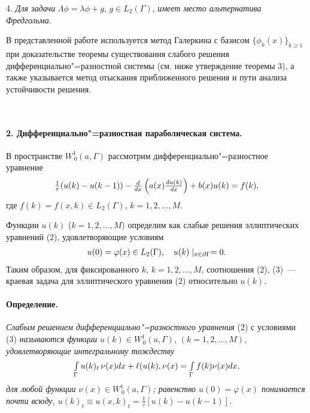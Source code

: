 4. \emph{Для задачи } ${\Lambda}\phi=\lambda \phi+g$, $g\in L_2(\Gamma)$, \emph{имеет место альтернатива Фредгольма}.



В представленной работе используется метод Галеркина с базисом $\{\phi_k(x)\}_{k\geqslant 1}$  при доказательстве теоремы существования слабого решения дифференциально"=разностной системы (см. ниже утверждение теоремы 3), а также указывается метод отыскания приближенного решения и пути анализа устойчивости решения.

\

\paragraph{2. Дифференциально"=разностная параболическая система.}
В пространстве $W^1_{\,0}(a,\Gamma)$  рассмотрим дифференциально"=разностное уравнение
\begin{equation}\label{eq2}
{{\begin{array}{*{20}c}
\frac{1}{\tau}(u(k)-u(k-1))-\frac{d }{d x }\left(a(x)\frac{d u(k)}{d x}\right)+b(x)u(k)=f(k),
 \end{array} }}
\end{equation}
где $f(k) =f(x,k)\in L_2(\Gamma)$, $k=1,2,...,M$.


Функции  $u(k)$ ($k=1,2,...,M$) определим как слабые решения эллиптических уравнений (2), удовлетворяющие условиям
\begin{equation}\label{eq3}
{{\begin{array}{*{20}c}
u(0)=\varphi(x)\in L_2(\Gamma), \quad u(k)\mid_{x\in\partial\Gamma}=0.
 \end{array} }}
\end{equation}
Таким образом, для фиксированного $k$, $k=1,2,...,M$, соотношения (2), (3)~--- краевая задача для  эллиптического уравнения (2) относительно $u(k)$.

\paragraph{Определение.} \emph{Слабым решением дифференциально"=разностного уравнения} (2) с условиями (3)  \emph{называются функции}  $u(k) \in W^1_{\,0}(a,\Gamma)$, $(k=1,2,...,M)$, \emph{удовлетворяющие интегральному тождеству}
\[
{{\begin{array}{*{20}c}
		\int\limits_{\Gamma}u(k)_t\,\nu(x)dx+\ell(u(k),\nu(x)=
		\int\limits_{\Gamma}f(k)\nu(x) dx,
		\end{array} }}
\]
\emph{для любой функции $\nu(x)\in W^1_{\,0}(a,\Gamma)$; равенство $u(0)=\varphi(x)$ понимается почти всюду, $u(k)_t \equiv u(x,k)_t=\frac{1}{\tau}[u(k)-u(k-1)]$.}


